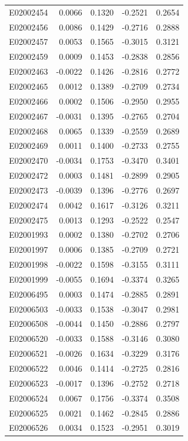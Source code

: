 \documentclass[11pt, a4paper]{article}
\begin{document}
\begin{longtable}{lrrrr}
E02002454 & 0.0066 & 0.1320 & -0.2521 & 0.2654 \\
E02002456 & 0.0086 & 0.1429 & -0.2716 & 0.2888 \\
E02002457 & 0.0053 & 0.1565 & -0.3015 & 0.3121 \\
E02002459 & 0.0009 & 0.1453 & -0.2838 & 0.2856 \\
E02002463 & -0.0022 & 0.1426 & -0.2816 & 0.2772 \\
E02002465 & 0.0012 & 0.1389 & -0.2709 & 0.2734 \\
E02002466 & 0.0002 & 0.1506 & -0.2950 & 0.2955 \\
E02002467 & -0.0031 & 0.1395 & -0.2765 & 0.2704 \\
E02002468 & 0.0065 & 0.1339 & -0.2559 & 0.2689 \\
E02002469 & 0.0011 & 0.1400 & -0.2733 & 0.2755 \\
E02002470 & -0.0034 & 0.1753 & -0.3470 & 0.3401 \\
E02002472 & 0.0003 & 0.1481 & -0.2899 & 0.2905 \\
E02002473 & -0.0039 & 0.1396 & -0.2776 & 0.2697 \\
E02002474 & 0.0042 & 0.1617 & -0.3126 & 0.3211 \\
E02002475 & 0.0013 & 0.1293 & -0.2522 & 0.2547 \\
E02001993 & 0.0002 & 0.1380 & -0.2702 & 0.2706 \\
E02001997 & 0.0006 & 0.1385 & -0.2709 & 0.2721 \\
E02001998 & -0.0022 & 0.1598 & -0.3155 & 0.3111 \\
E02001999 & -0.0055 & 0.1694 & -0.3374 & 0.3265 \\
E02006495 & 0.0003 & 0.1474 & -0.2885 & 0.2891 \\
E02006503 & -0.0033 & 0.1538 & -0.3047 & 0.2981 \\
E02006508 & -0.0044 & 0.1450 & -0.2886 & 0.2797 \\
E02006520 & -0.0033 & 0.1588 & -0.3146 & 0.3080 \\
E02006521 & -0.0026 & 0.1634 & -0.3229 & 0.3176 \\
E02006522 & 0.0046 & 0.1414 & -0.2725 & 0.2816 \\
E02006523 & -0.0017 & 0.1396 & -0.2752 & 0.2718 \\
E02006524 & 0.0067 & 0.1756 & -0.3374 & 0.3508 \\
E02006525 & 0.0021 & 0.1462 & -0.2845 & 0.2886 \\
E02006526 & 0.0034 & 0.1523 & -0.2951 & 0.3019 \\

\end{longtable}
\end{document}
